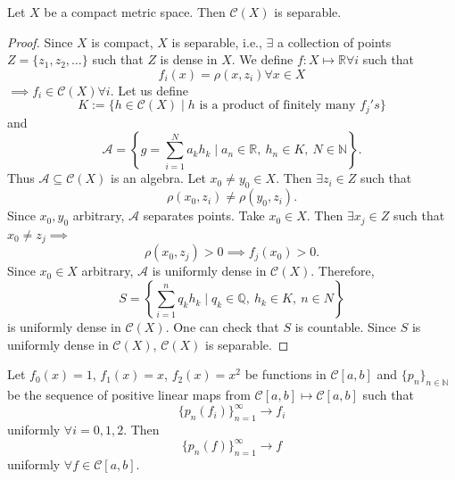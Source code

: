 \documentclass{functionspaces}
\begin{document}
\begin{theorem}
Let \( X \) be a compact metric space. Then \( \mathcal{C}(X) \) is separable.
\end{theorem}

\begin{proof}
Since \( X \) is compact, \( X \) is separable, i.e., \( \exists  \) a collection of points \( Z=\{z_{1},z_{2},\ldots\} \) such that \( Z \) is dense in \( X \). We define \( f:X\mapsto\mathbb{R}  \forall  i \) such that
\[
f_{i}(x)=\rho(x,z_{i})  \forall  x \in X
\]
\( \implies f_{i} \in \mathcal{C}(X)  \forall  i \). Let us define
\[
K:=\{h \in \mathcal{C}(X) \mid h \text{ is a product of finitely many } f_{j}'s\}
\]
and
\[
\mathcal{A}=\left\{g=\sum_{i=1}^{N}a_{k}h_{k} \mid a_{n} \in \mathbb{R},\ h_{n} \in K,\ N \in \mathbb{N}\right\}.
\]
Thus \( \mathcal{A} \subseteq \mathcal{C}(X) \) is an algebra. Let \( x_{0} \neq y_{0} \in X \). Then \( \exists  z_{i} \in Z \) such that
\[
\rho(x_{0},z_{i}) \neq \rho(y_{0},z_{i}).
\]
Since \( x_{0},y_{0} \) arbitrary, \( \mathcal{A} \) separates points. Take \( x_{0} \in X \). Then \( \exists  x_{j} \in Z \) such that \( x_{0} \neq z_{j}  \implies \)
\[
\rho(x_{0},z_{j})>0  \implies  f_{j}(x_{0})>0.
\]
Since \( x_{0} \in X \) arbitrary, \( \mathcal{A} \) is uniformly dense in \( \mathcal{C}(X) \). Therefore,
\[
S=\left\{\sum_{i=1}^{n}q_{k}h_{k} \mid q_{k} \in \mathbb{Q},\ h_{k} \in K,\ n \in N\right\}
\]
is uniformly dense in \( \mathcal{C}(X) \). One can check that \( S \) is countable. Since \( S \) is uniformly dense in \( \mathcal{C}(X) \), \( \mathcal{C}(X) \) is separable.
\end{proof}

\begin{theorem}
Let \( f_{0}(x)=1 \), \( f_{1}(x)=x \), \( f_{2}(x)=x^{2} \) be functions in \( \mathcal{C}[a,b] \) and \( \{p_{n}\}_{n\in\mathbb{N}} \) be the sequence of positive linear maps from \( \mathcal{C}[a,b] \mapsto \mathcal{C}[a,b] \) such that
\[
\{p_{n}(f_{i})\}_{n=1}^{\infty} \to f_{i}
\]
uniformly \( \forall  i=0,1,2 \). Then
\[
\{p_{n}(f)\}_{n=1}^{\infty} \to f
\]
uniformly \( \forall  f \in \mathcal{C}[a,b] \).
\end{theorem}
\end{document}
